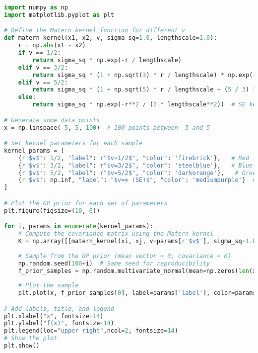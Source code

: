 \documentclass[12pt,a4paper]{article}
\begin{document}
\vspace{10pt}
\begin{lstlisting}[language=python, caption={Code of the Creation of Figure \ref{fig:Mat samples diff class plot}}]
import numpy as np
import matplotlib.pyplot as plt

# Define the Matern kernel function for different v
def matern_kernel(x1, x2, v, sigma_sq=1.0, lengthscale=1.0):
    r = np.abs(x1 - x2)
    if v == 1/2:
        return sigma_sq * np.exp(-r / lengthscale)
    elif v == 3/2:
        return sigma_sq * (1 + np.sqrt(3) * r / lengthscale) * np.exp(-np.sqrt(3) * r / lengthscale)
    elif v == 5/2:
        return sigma_sq * (1 + np.sqrt(5) * r / lengthscale + (5 / 3) * (r**2) / lengthscale**2) * np.exp(-np.sqrt(5) * r / lengthscale)
    else:
        return sigma_sq * np.exp(-r**2 / (2 * lengthscale**2))  # SE kernel when v -> infinity

# Generate some data points
x = np.linspace(-5, 5, 100)  # 100 points between -5 and 5

# Set kernel parameters for each sample
kernel_params = [
    {r'$v$': 1/2, "label": r"$v=1/2$", "color": 'firebrick'},   # Red for v=1/2
    {r'$v$': 3/2, "label": r"$v=3/2$", "color": 'steelblue'},   # Blue for v=3/2
    {r'$v$': 5/2, "label": r"$v=5/2$", "color": 'darkorange'},   # Green for v=5/2
    {r'$v$': np.inf, "label": "$v=∞ (SE)$", "color": 'mediumpurple'}  # Purple for SE kernel (v->∞)
]

# Plot the GP prior for each set of parameters
plt.figure(figsize=(10, 6))

for i, params in enumerate(kernel_params):
    # Compute the covariance matrix using the Matern kernel
    K = np.array([[matern_kernel(xi, xj, v=params[r'$v$'], sigma_sq=1.0, lengthscale=1.0) for xj in x] for xi in x])
    
    # Sample from the GP prior (mean vector = 0, covariance = K)
    np.random.seed(100+i)  # Same seed for reproducibility
    f_prior_samples = np.random.multivariate_normal(mean=np.zeros(len(x)), cov=K, size=1)
    
    # Plot the sample
    plt.plot(x, f_prior_samples[0], label=params['label'], color=params['color'], linewidth=3)

# Add labels, title, and legend
plt.xlabel("x", fontsize=14)
plt.ylabel("f(x)", fontsize=14)
plt.legend(loc="upper right",ncol=2, fontsize=14)
# Show the plot
plt.show()
\end{lstlisting}
\end{document}
